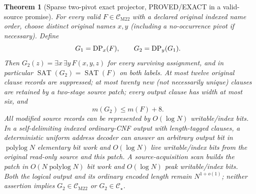 \documentclass[11pt]{article}
\newtheorem{theorem}{Theorem}
\newcommand{\CM}{\mathcal C_{\mathrm{M22}}}
\newcommand{\CS}{\mathcal C_\star}
\newcommand{\SAT}{\operatorname{SAT}}
\begin{document}
\begin{theorem}[Sparse two-pivot exact projector, PROVED/EXACT in a valid-source promise]
For every valid $F\in\CM$ with a declared original indexed name order, choose distinct original names $x,y$ (including a no-occurrence pivot if necessary). Define
\[
           G_1={\rm DP}_x(F),\qquad G_2={\rm DP}_y(G_1).
\]
Then $G_2(z)=\exists x\,\exists y\,F(x,y,z)$ for \emph{every} surviving assignment, and in particular $\SAT(G_2)=\SAT(F)$ on both labels.
At most twelve original clause records are suppressed; at most twenty new (not necessarily unique) clauses are retained by a two-stage source patch; every output clause has width at most six, and
\[
              m(G_2)\le m(F)+8.                  \tag{2}
\]
All modified source records can be represented by $O(\log N)$ writable/index bits. In a self-delimiting indexed \emph{ordinary}-CNF output with length-tagged clauses, a deterministic uniform address decoder can answer an arbitrary output bit in $\operatorname{polylog}N$ elementary bit work and $O(\log N)$ live writable/index bits from the original read-only source and this patch. A source-acquisition scan builds the patch in $O(N\operatorname{polylog}N)$ bit work and $O(\log N)$ peak writable/index bits. Both the logical output and its ordinary encoded length remain $N^{1+o(1)}$; neither assertion implies $G_2\in\CM$ or $G_2\in\CS$.
\end{theorem}
\end{document}

